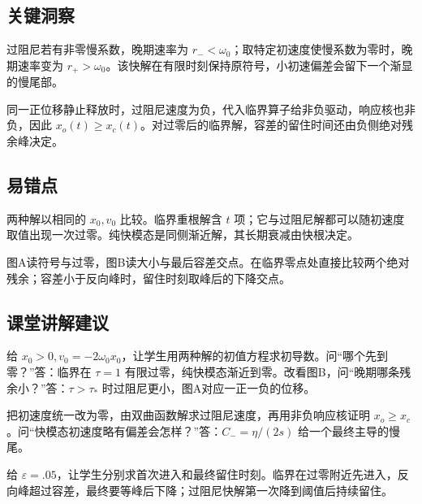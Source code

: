 \documentclass[UTF8,fontset=fandol,a4paper,11pt]{ctexart}
\begin{document}


\subsection*{关键洞察}

过阻尼若有非零慢系数，晚期速率为 $r_-<\omega_0$；取特定初速度使慢系数为零时，晚期速率变为 $r_+>\omega_0$。该快解在有限时刻保持原符号，小初速偏差会留下一个渐显的慢尾部。

同一正位移静止释放时，过阻尼速度为负，代入临界算子给非负驱动，响应核也非负，因此 $x_o(t)\ge x_c(t)$。对过零后的临界解，容差的留住时间还由负侧绝对残余峰决定。




\subsection*{易错点}

两种解以相同的 $x_0,v_0$ 比较。临界重根解含 $t$ 项；它与过阻尼解都可以随初速度取值出现一次过零。纯快模态是同侧渐近解，其长期衰减由快根决定。

图A读符号与过零，图B读大小与最后容差交点。在临界零点处直接比较两个绝对残余；容差小于反向峰时，留住时刻取峰后的下降交点。




\subsection*{课堂讲解建议}

给 $x_0>0,v_0=-2\omega_0x_0$，让学生用两种解的初值方程求初导数。问“哪个先到零？”答：临界在 $\tau=1$ 有限过零，纯快模态渐近到零。改看图B，问“晚期哪条残余小？”答：$\tau>\tau_*$ 时过阻尼更小，图A对应一正一负的位移。

把初速度统一改为零，由双曲函数解求过阻尼速度，再用非负响应核证明 $x_o\ge x_c$。问“快模态初速度略有偏差会怎样？”答：$C_-=\eta/(2s)$ 给一个最终主导的慢尾。

给 $\varepsilon=.05$，让学生分别求首次进入和最终留住时刻。临界在过零附近先进入，反向峰超过容差，最终要等峰后下降；过阻尼快解第一次降到阈值后持续留住。


\end{document}
